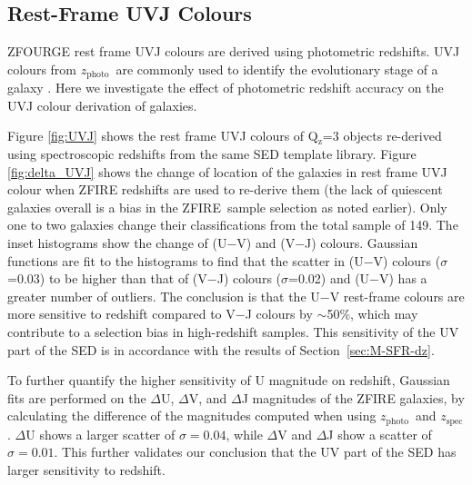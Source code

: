 \documentclass[iop]{emulateapj}
\newcommand{\around}{$\sim$}
\newcommand{\zspec}{$z_{\mathrm{spec}}$}
\newcommand{\zphoto}{$z_{\mathrm{photo}}$}
\begin{document}
\subsection{Rest-Frame UVJ Colours}


ZFOURGE rest frame UVJ colours are derived using photometric redshifts. 
UVJ colours from \zphoto\ are commonly used to identify the evolutionary stage of a galaxy \citep{Williams2009}. Here we investigate the effect of photometric redshift
accuracy on the UVJ colour derivation of galaxies. 

Figure \ref{fig:UVJ} shows the rest frame UVJ colours of Q$\mathrm{_z}$=3 objects re-derived using spectroscopic redshifts from the same SED template library. 
Figure \ref{fig:delta_UVJ} shows the change of location of the galaxies in rest frame UVJ colour when ZFIRE redshifts are used to re-derive them (the lack of quiescent galaxies overall is a bias in the ZFIRE\ sample selection as noted earlier).
Only one to two galaxies change their classifications from the total sample of 149. 
The inset histograms show the change of (U$-$V) and (V$-$J) colours. Gaussian functions are fit to the histograms to find that the scatter in (U$-$V) colours ($\sigma$=0.03) to be higher than that of (V$-$J) colours ($\sigma$=0.02) and (U$-$V)  has a greater number of outliers. 
The conclusion is that the U$-$V rest-frame colours are more sensitive to redshift compared to V$-$J colours by \around50\%, which may contribute to a selection bias in high-redshift samples. This sensitivity of the UV part of the SED is in accordance with the results of Section~\ref{sec:M-SFR-dz}. 


To further quantify the higher sensitivity of U magnitude on redshift, Gaussian fits are performed on the $\Delta$U, $\Delta$V, and $\Delta$J magnitudes of the ZFIRE galaxies, by calculating the difference of the magnitudes computed when using \zphoto\ and \zspec. $\Delta$U shows a larger scatter of $\sigma=0.04$, while $\Delta$V and $\Delta$J show a scatter of $\sigma=0.01$. This further validates our conclusion that the UV part of the SED has larger sensitivity to redshift. 
\end{document}
